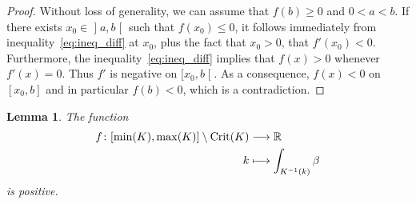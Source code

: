 \documentclass[10pt,a4paper]{amsart}
\DeclareMathOperator{\Crit}{Crit}
\newcommand{\bbR}{\mathbb{R}}
\renewcommand*{\to}{\mathchoice{\longrightarrow}{\rightarrow}{\rightarrow}{\rightarrow}}
\let\oldmapsto\mapsto
\renewcommand*{\mapsto}{\mathchoice{\longmapsto}{\oldmapsto}{\oldmapsto}{\oldmapsto}}
\newtheorem{lemm}[theo]{Lemma}
\theoremstyle{definition}\newtheorem{defi}[theo]{Definition}
\begin{document}
\begin{proof}
Without loss of generality, we can assume that $f(b) \geq 0$ and $0 < a < b$. If there exists $x_0 \in\mathopen{]}a,b\mathclose{[}$ such that $f(x_0) \leq 0$, it follows immediately from inequality~\eqref{eq:ineq_diff} at $x_0$, plus the fact that $x_0 > 0$, that $f'(x_0) < 0$. Furthermore, the inequality~\eqref{eq:ineq_diff} implies that $f(x) > 0$ whenever $f'(x) = 0$. Thus $f'$ is negative on $[x_0,b\mathclose{[}$. As a consequence, $f(x) < 0$ on $[x_0, b]$ and in particular $f(b) < 0$, which is a contradiction.
\end{proof}


\begin{lemm}\label{lemma:int_ligne_niveau_positive}
The function
\begin{align*}
f  \colon [\min(K), \max(K)] \setminus \Crit(K) &\to \bbR \\
k & \mapsto \int_{K^{-1}(k)}\beta
\end{align*}
is positive.
\end{lemm}
\end{document}
